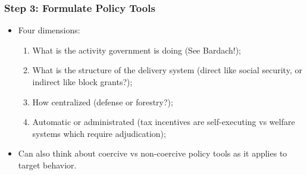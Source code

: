 \documentclass[aspectratio=169]{beamer}
\theoremstyle{principle}
\begin{document}
\begin{frame}
\frametitle{Step 3: Formulate Policy Tools}
\begin{itemize}
\item Four dimensions:
\begin{enumerate}
\item What is the activity government is doing (See Bardach!);
\item What is the structure of the delivery system (direct like social security, or indirect like block grants?);
\item How centralized (defense or forestry?);
\item Automatic or administrated (tax incentives are self-executing vs welfare systems which require adjudication);
\end{enumerate}
\bigskip
\bigskip

\item Can also think about coercive vs non-coercive policy tools as it applies to target behavior.
\end{itemize}
\end{frame}
\end{document}
